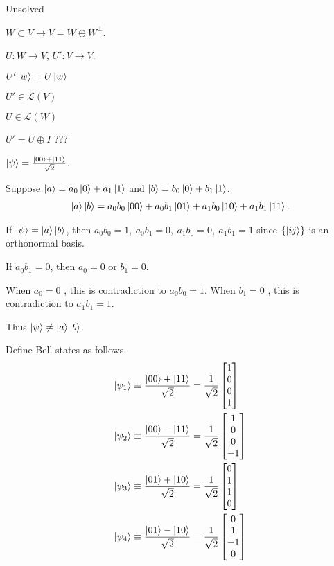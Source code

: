 
Unsolved

$W \subset V \rightarrow V = W \oplus W^\perp$.

$U: W \rightarrow V$, $U': V \rightarrow V$.

$U' \ket{w} = U\ket{w}$

$U' \in \mathcal{L}(V)$

$U \in \mathcal{L}(W)$

$U' = U \oplus I$ ???



$\ket{\psi} = \frac{\ket{00} + \ket{11}}{\sqrt{2}}$.

Suppose $\ket{a} = a_0 \ket{0}  + a_1\ket{1}$ and $\ket{b} = b_0 \ket{0}  + b_1\ket{1}$.
%
\begin{align*}
    \ket{a} \ket{b} = a_0 b_0 \ket{00} + a_0 b_1 \ket{01} + a_1 b_0 \ket{10} + a_1 b_1 \ket{11}.
\end{align*}

If $\ket{\psi} = \ket{a} \ket{b}$, then $a_0 b_0 = 1,~ a_0 b_1=0,~ a_1 b_0 = 0,~ a_1 b_1 = 1$ since $\{\ket{ij}\}$ is an orthonormal basis.

If $a_0 b_1 = 0$, then $a_0 = 0$ or $b_1 = 0$.

When $a_0 = 0$ , this is contradiction to $a_0 b_0 = 1$.
When $b_1 = 0$ , this is contradiction to $a_1 b_1 = 1$.

Thus $\ket{\psi} \neq \ket{a} \ket{b}$.


Define Bell states as follows.
\begin{align*}
    \ket{\psi_1} &\equiv \frac{\ket{00} + \ket{11}}{\sqrt{2}} = \frac{1}{\sqrt{2}} \begin{bmatrix}
    1 \\
    0 \\
    0 \\
    1
    \end{bmatrix} \\
    \ket{\psi_2} &\equiv \frac{\ket{00} - \ket{11}}{\sqrt{2}} = \frac{1}{\sqrt{2}} \begin{bmatrix}
    1 \\
    0 \\
    0 \\
    -1
    \end{bmatrix} \\
    \ket{\psi_3} &\equiv \frac{\ket{01} + \ket{10}}{\sqrt{2}} = \frac{1}{\sqrt{2}} \begin{bmatrix}
    0 \\
    1 \\
    1 \\
    0
    \end{bmatrix} \\
    \ket{\psi_4} &\equiv \frac{\ket{01} - \ket{10}}{\sqrt{2}} = \frac{1}{\sqrt{2}} \begin{bmatrix}
    0 \\
    1 \\
    -1 \\
    0
    \end{bmatrix} \\
\end{align*}

